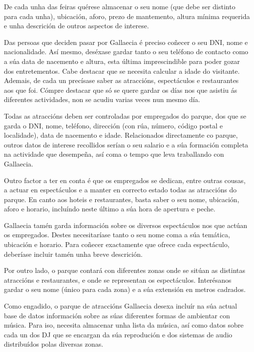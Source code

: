 \documentclass[12pt,a4paper]{book}
\theoremstyle{definition}
\theoremstyle{break}
\begin{document}
De cada unha das feiras quérese almacenar o seu nome (que debe ser distinto para cada unha), ubicación, aforo, prezo de mantemento, altura mínima requerida e unha descrición de outros aspectos de interese.

Das persoas que deciden pasar por {\logo Gallaecia} é preciso coñecer o seu DNI, nome e nacionalidade. Así mesmo, deséxase gardar tanto o seu teléfono de contacto como a súa data de nacemento e altura, esta última imprescindible para poder gozar dos entretementos. Cabe destacar que se necesita calcular a idade do visitante. Ademais, de cada un precísase saber as atraccións, espectáculos e restaurantes aos que foi. Cómpre destacar que só se quere gardar os días nos que asistiu ás diferentes actividades, non se acudiu varias veces nun mesmo día.

Todas as atraccións deben ser controladas por empregados do parque, dos que se garda o DNI, nome, teléfono, dirección (con rúa, número, código postal e localidade), data de nacemento e idade. Relacionados directamente co parque, outros datos de interese recollidos serían o seu salario e a súa formación completa na actividade que desempeña, así coma o tempo que leva traballando con {\logo Gallaecia}.

Outro factor a ter en conta é que os empregados se dedican, entre outras cousas, a actuar en espectáculos e a manter en correcto estado todas as atraccións do parque. En canto aos hoteis e restaurantes, basta saber o seu nome, ubicación, aforo e horario, incluíndo neste último a súa hora de apertura e peche.

{\logo Gallaecia} tamén garda información sobre os diversos espectáculos nos que actúan os empregados. Destes necesitaríase tanto o seu nome coma a súa temática, ubicación e horario. Para coñecer exactamente que ofrece cada espectáculo, deberíase incluir tamén unha breve descrición.

Por outro lado, o parque contará con diferentes zonas onde se sitúan as distintas atraccións e restaurantes, e onde se representan os espectáculos. Interésanos gardar o seu nome (único para cada zona) e a súa extensión en metros cadrados.

Como engadido, o parque de atraccións {\logo Gallaecia} desexa incluír na súa actual base de datos información sobre as súas diferentes formas de ambientar con música. Para iso, necesita almacenar unha lista da música, así como datos sobre cada un dos DJ que
se encargan da súa reprodución e dos sistemas de audio distribuídos polas
diversas zonas.
\end{document}
